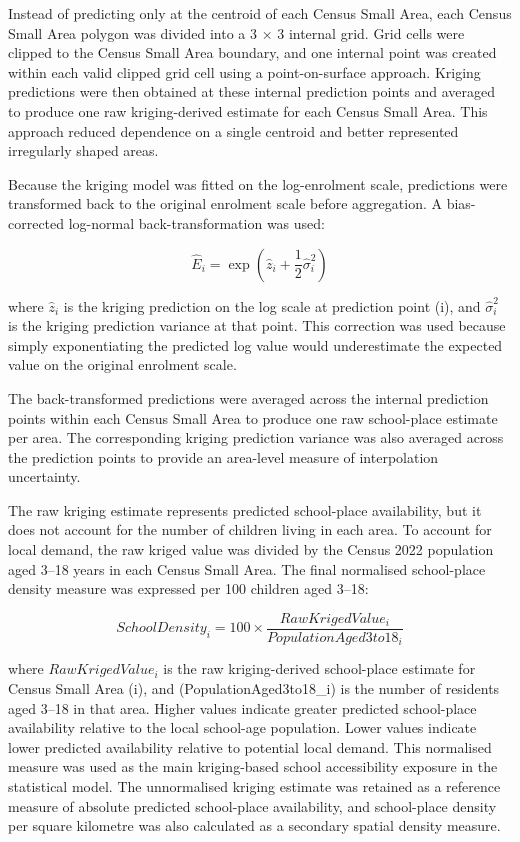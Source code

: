 \documentclass{article}
\begin{document}
Instead of predicting only at the centroid of each Census Small Area,
each Census Small Area polygon was divided into a 3 × 3 internal grid.
Grid cells were clipped to the Census Small Area boundary, and one
internal point was created within each valid clipped grid cell using a
point-on-surface approach. Kriging predictions were then obtained at
these internal prediction points and averaged to produce one raw
kriging-derived estimate for each Census Small Area. This approach
reduced dependence on a single centroid and better represented
irregularly shaped areas.

Because the kriging model was fitted on the log-enrolment scale,
predictions were transformed back to the original enrolment scale before
aggregation. A bias-corrected log-normal back-transformation was used:

\[
\widehat{E}_i =
\exp \left(
\hat{z}_i + \frac{1}{2}\hat{\sigma}^{2}_i
\right)
\]

where \(\hat{z}_i\) is the kriging prediction on the log scale at
prediction point (i), and \(\hat{\sigma}^{2}_i\) is the kriging
prediction variance at that point. This correction was used because
simply exponentiating the predicted log value would underestimate the
expected value on the original enrolment scale.

The back-transformed predictions were averaged across the internal
prediction points within each Census Small Area to produce one raw
school-place estimate per area. The corresponding kriging prediction
variance was also averaged across the prediction points to provide an
area-level measure of interpolation uncertainty.

The raw kriging estimate represents predicted school-place availability,
but it does not account for the number of children living in each area.
To account for local demand, the raw kriged value was divided by the
Census 2022 population aged 3--18 years in each Census Small Area. The
final normalised school-place density measure was expressed per 100
children aged 3--18:

\[
SchoolDensity_i =
100 \times
\frac{RawKrigedValue_i}{PopulationAged3to18_i}
\]

where \(RawKrigedValue_i\) is the raw kriging-derived school-place
estimate for Census Small Area (i), and (PopulationAged3to18\_i) is the
number of residents aged 3--18 in that area. Higher values indicate
greater predicted school-place availability relative to the local
school-age population. Lower values indicate lower predicted
availability relative to potential local demand. This normalised measure
was used as the main kriging-based school accessibility exposure in the
statistical model. The unnormalised kriging estimate was retained as a
reference measure of absolute predicted school-place availability, and
school-place density per square kilometre was also calculated as a
secondary spatial density measure.
\end{document}
